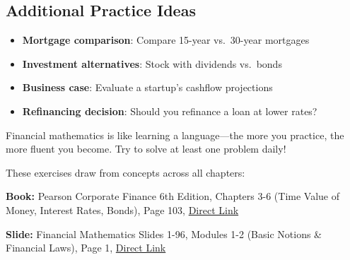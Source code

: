 \documentclass[
  letterpaper,
]{scrbook}
\providecommand{\tightlist}{%
  \setlength{\itemsep}{0pt}\setlength{\parskip}{0pt}}
\begin{document}
\subsection{Additional Practice Ideas}\label{additional-practice-ideas}

\begin{itemize}
\tightlist
\item
  \textbf{Mortgage comparison}: Compare 15-year vs.~30-year mortgages
\item
  \textbf{Investment alternatives}: Stock with dividends vs.~bonds
\item
  \textbf{Business case}: Evaluate a startup's cashflow projections
\item
  \textbf{Refinancing decision}: Should you refinance a loan at lower
  rates?
\end{itemize}

\begin{tcolorbox}[enhanced jigsaw, toptitle=1mm, colbacktitle=quarto-callout-tip-color!10!white, opacityback=0, leftrule=.75mm, breakable, colframe=quarto-callout-tip-color-frame, toprule=.15mm, opacitybacktitle=0.6, coltitle=black, bottomrule=.15mm, colback=white, arc=.35mm, titlerule=0mm, rightrule=.15mm, left=2mm, title=\textcolor{quarto-callout-tip-color}{\faLightbulb}\hspace{0.5em}{Keep Practicing!}, bottomtitle=1mm]

Financial mathematics is like learning a language---the more you
practice, the more fluent you become. Try to solve at least one problem
daily!

\end{tcolorbox}

\begin{tcolorbox}[enhanced jigsaw, toptitle=1mm, colbacktitle=quarto-callout-caution-color!10!white, opacityback=0, leftrule=.75mm, breakable, colframe=quarto-callout-caution-color-frame, toprule=.15mm, opacitybacktitle=0.6, coltitle=black, bottomrule=.15mm, colback=white, arc=.35mm, titlerule=0mm, rightrule=.15mm, left=2mm, title=\textcolor{quarto-callout-caution-color}{\faFire}\hspace{0.5em}{References}, bottomtitle=1mm]

These exercises draw from concepts across all chapters:

\textbf{Book:} Pearson Corporate Finance 6th Edition, Chapters 3-6 (Time
Value of Money, Interest Rates, Bonds), Page 103,
\href{https://cdn.jsdelivr.net/gh/mrbungie/financial_maths@main/resources/books/pearson_corporate_finance_6th.pdf\#page=103}{Direct
Link}

\textbf{Slide:} Financial Mathematics Slides 1-96, Modules 1-2 (Basic
Notions \& Financial Laws), Page 1,
\href{https://cdn.jsdelivr.net/gh/mrbungie/financial_maths@main/resources/slideshows/25_09_30_FinancialMathematics_Slides_1_96.pdf\#page=1}{Direct
Link}

\end{tcolorbox}
\end{document}
